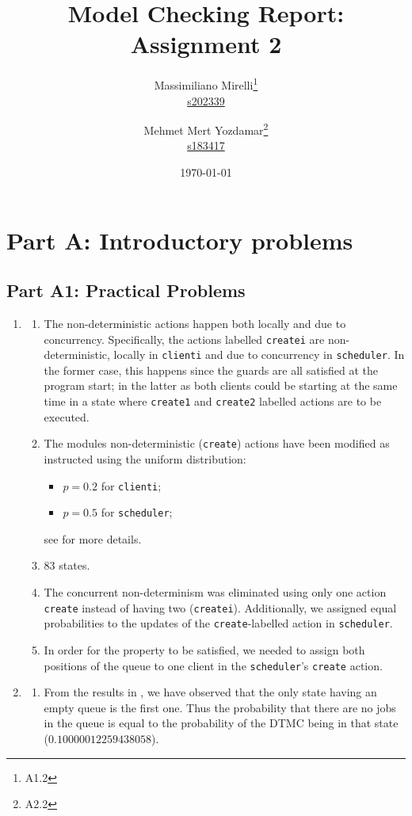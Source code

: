 \documentclass{report}
\title{Model Checking Report: Assignment 2}
\author{Massimiliano Mirelli\footnote{A1.2} \\  \href{mailto:s202339@dtu.dk}{s202339} \and Mehmet Mert Yozdamar\footnote{A2.2} \\ \href{mailto:s183417@dtu.dk }{s183417} }
\date{\today}
\begin{document}
\maketitle
\tableofcontents
\newpage

\part{Part A: Introductory problems}

\chapter{Part A1: Practical Problems}
\begin{enumerate}
\item
  \begin{enumerate}
  \item The non-deterministic actions happen both locally and due to concurrency. Specifically, the actions labelled \verb|createi| are non-deterministic, locally in \verb|clienti| and due to concurrency in \verb|scheduler|. In the former case, this happens since the guards are all satisfied at the program start; in the latter as both clients could be starting at the same time in a state where \verb|create1| and \verb|create2| labelled actions are to be executed. 
  \item The modules non-deterministic (\verb|create|) actions have been modified as instructed using the uniform distribution:
    \begin{itemize}
    \item $p=0.2$ for \verb|clienti|;
    \item $p=0.5$ for \verb|scheduler|;
    \end{itemize}  
    see  for more details.
  \item 83 states.
  \item The concurrent non-determinism was eliminated using only one action \verb|create| instead of having two (\verb|createi|). Additionally, we assigned equal probabilities to the updates of the \verb|create|-labelled action in \verb|scheduler|.
  \item In order for the property to be satisfied, we needed to assign both positions of the queue to one client in the \verb|scheduler|'s \verb|create| action.
  \end{enumerate}
\item
  \begin{enumerate}
  \item From the results in , we have observed that the only state having an empty queue is the first one. Thus the probability that there are no jobs in the queue is equal to the probability of the DTMC being in that state ($0.10000012259438058$).

\end{enumerate}
\end{enumerate}
\end{document}
